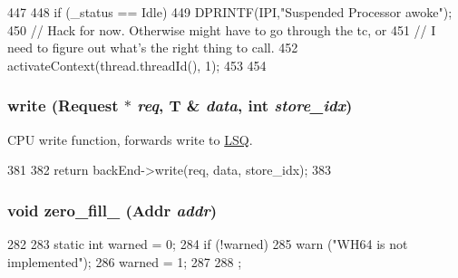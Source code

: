 \begin{DoxyCode}
447 {
448     if (_status == Idle) {
449         DPRINTF(IPI,"Suspended Processor awoke\n");
450         // Hack for now.  Otherwise might have to go through the tc, or
451         // I need to figure out what's the right thing to call.
452         activateContext(thread.threadId(), 1);
453     }
454 }
\end{DoxyCode}
\hypertarget{classOzoneCPU_aa934cdc9883884b14ba62daa03c2c171}{
\subsubsection[{write}]{ write ({\bf Request} $\ast$ {\em req}, \/  T \& {\em data}, \/  int {\em store\_\-idx})}}
\label{classOzoneCPU_aa934cdc9883884b14ba62daa03c2c171}
CPU write function, forwards write to \hyperlink{classLSQ}{LSQ}. 


\begin{DoxyCode}
381     {
382         return backEnd->write(req, data, store_idx);
383     }
\end{DoxyCode}
\hypertarget{classOzoneCPU_ab009616bac40c9b920ed54fccca517a9}{
\subsubsection[{zero\_\-fill\_\-64}]{\setlength{\rightskip}{0pt plus 5cm}void zero\_\-fill\_ ({\bf Addr} {\em addr})}}
\label{classOzoneCPU_ab009616bac40c9b920ed54fccca517a9}



\begin{DoxyCode}
282                                  {
283         static int warned = 0;
284         if (!warned) {
285             warn ("WH64 is not implemented");
286             warned = 1;
287         }
288     };
\end{DoxyCode}


